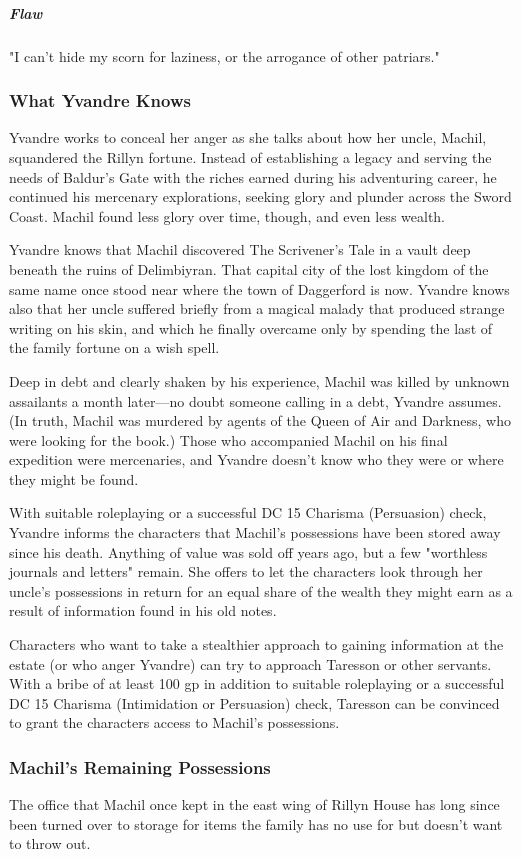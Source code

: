 \documentclass[10pt,a4paper,twoside,bg=print,twocolumn,openany,nodeprecatedcode]{dndbook}
\begin{document}
\subparagraph{Flaw}
"I can't hide my scorn for laziness, or the arrogance of other patriars."

\subsubsection{What Yvandre Knows}
Yvandre works to conceal her anger as she talks about how her uncle, Machil, squandered the Rillyn fortune. Instead of establishing a legacy and serving the needs of Baldur's Gate with the riches earned during his adventuring career, he continued his mercenary explorations, seeking glory and plunder across the Sword Coast. Machil found less glory over time, though, and even less wealth.

Yvandre knows that Machil discovered The Scrivener's Tale in a vault deep beneath the ruins of Delimbiyran. That capital city of the lost kingdom of the same name once stood near where the town of Daggerford is now. Yvandre knows also that her uncle suffered briefly from a magical malady that produced strange writing on his skin, and which he finally overcame only by spending the last of the family fortune on a wish spell.

Deep in debt and clearly shaken by his experience, Machil was killed by unknown assailants a month later—no doubt someone calling in a debt, Yvandre assumes. (In truth, Machil was murdered by agents of the Queen of Air and Darkness, who were looking for the book.) Those who accompanied Machil on his final expedition were mercenaries, and Yvandre doesn't know who they were or where they might be found.

With suitable roleplaying or a successful DC 15 Charisma (Persuasion) check, Yvandre informs the characters that Machil's possessions have been stored away since his death. Anything of value was sold off years ago, but a few "worthless journals and letters" remain. She offers to let the characters look through her uncle's possessions in return for an equal share of the wealth they might earn as a result of information found in his old notes.

Characters who want to take a stealthier approach to gaining information at the estate (or who anger Yvandre) can try to approach Taresson or other servants. With a bribe of at least 100 gp in addition to suitable roleplaying or a successful DC 15 Charisma (Intimidation or Persuasion) check, Taresson can be convinced to grant the characters access to Machil's possessions.

\subsubsection{Machil's Remaining Possessions}
The office that Machil once kept in the east wing of Rillyn House has long since been turned over to storage for items the family has no use for but doesn't want to throw out.
\end{document}

